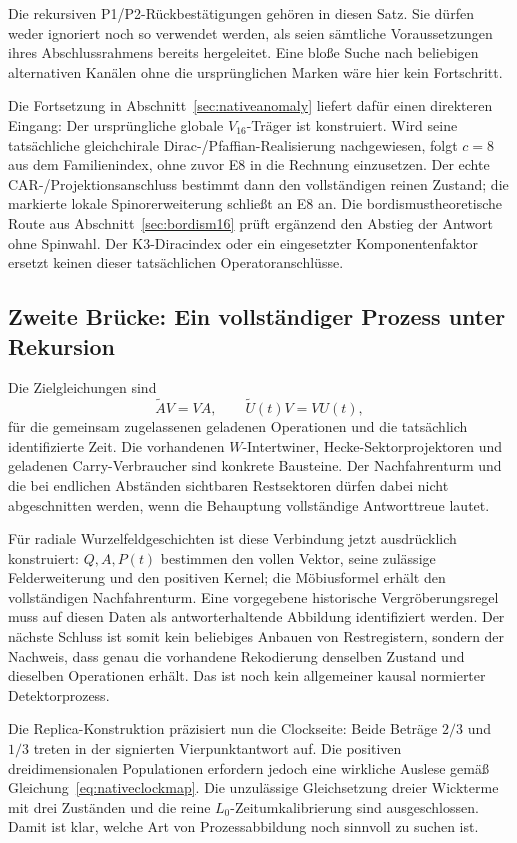 Die rekursiven P1/P2-Rückbestätigungen gehören in diesen Satz. Sie dürfen weder ignoriert noch so verwendet werden, als seien sämtliche Voraussetzungen ihres Abschlussrahmens bereits hergeleitet. Eine bloße Suche nach beliebigen alternativen Kanälen ohne die ursprünglichen Marken wäre hier kein Fortschritt.

Die Fortsetzung in Abschnitt~\ref{sec:nativeanomaly} liefert dafür einen direkteren Eingang: Der ursprüngliche globale $V_{16}$-Träger ist konstruiert. Wird seine tatsächliche gleichchirale Dirac-/Pfaffian-Realisierung nachgewiesen, folgt $c=8$ aus dem Familienindex, ohne zuvor E8 in die Rechnung einzusetzen. Der echte CAR-/Projektionsanschluss bestimmt dann den vollständigen reinen Zustand; die markierte lokale Spinorerweiterung schließt an E8 an. Die bordismustheoretische Route aus Abschnitt~\ref{sec:bordism16} prüft ergänzend den Abstieg der Antwort ohne Spinwahl. Der K3-Diracindex oder ein eingesetzter Komponentenfaktor ersetzt keinen dieser tatsächlichen Operatoranschlüsse.

\subsection{Zweite Brücke: Ein vollständiger Prozess unter Rekursion}
Die Zielgleichungen sind
\begin{equation}
\widetilde A V=VA,\qquad \widetilde U(t)V=VU(t),
\end{equation}
für die gemeinsam zugelassenen geladenen Operationen und die tatsächlich identifizierte Zeit. Die vorhandenen $W$-Intertwiner, Hecke-Sektorprojektoren und geladenen Carry-Verbraucher sind konkrete Bausteine. Der Nachfahrenturm und die bei endlichen Abständen sichtbaren Restsektoren dürfen dabei nicht abgeschnitten werden, wenn die Behauptung vollständige Antworttreue lautet.

Für radiale Wurzelfeldgeschichten ist diese Verbindung jetzt ausdrücklich konstruiert: $Q,A,P(t)$ bestimmen den vollen Vektor, seine zulässige Felderweiterung und den positiven Kernel; die Möbiusformel erhält den vollständigen Nachfahrenturm. Eine vorgegebene historische Vergröberungsregel muss auf diesen Daten als antworterhaltende Abbildung identifiziert werden. Der nächste Schluss ist somit kein beliebiges Anbauen von Restregistern, sondern der Nachweis, dass genau die vorhandene Rekodierung denselben Zustand und dieselben Operationen erhält. Das ist noch kein allgemeiner kausal normierter Detektorprozess.

Die Replica-Konstruktion präzisiert nun die Clockseite: Beide Beträge $2/3$ und $1/3$ treten in der signierten Vierpunktantwort auf. Die positiven dreidimensionalen Populationen erfordern jedoch eine wirkliche Auslese gemäß Gleichung~\eqref{eq:nativeclockmap}. Die unzulässige Gleichsetzung dreier Wickterme mit drei Zuständen und die reine $L_0$-Zeitumkalibrierung sind ausgeschlossen. Damit ist klar, welche Art von Prozessabbildung noch sinnvoll zu suchen ist.

